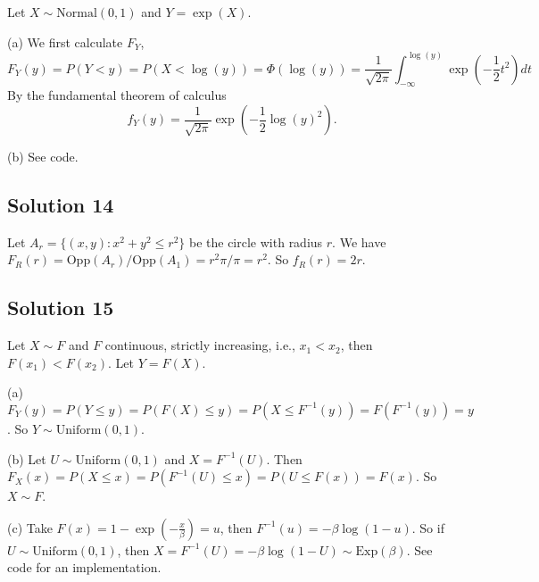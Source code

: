Let $X \sim \mathrm{Normal}(0, 1)$ and $Y = \exp(X)$.

(a) We first calculate $F_Y$,
\begin{equation*}
F_Y(y) = P(Y < y)
    = P(X < \log(y))
    = \Phi(\log(y))
    = \frac{1}{\sqrt{2\pi}} \int_{-\infty}^{\log(y)} \exp\left(-\frac{1}{2} t^2\right) dt
\end{equation*}
By the fundamental theorem of calculus
$$
f_Y(y) = \frac{1}{\sqrt{2\pi}} \exp\left(-\frac{1}{2} \log(y)^2\right).
$$

(b) See code.


\subsection*{Solution 14}

Let $A_r = \{(x, y) : x^2 + y^2 \leq r^2\}$ be the circle with radius $r$.
We have $F_R(r) = \mathrm{Opp}(A_r) / \mathrm{Opp}(A_1) = r^2 \pi / \pi = r^2$.
So $f_R(r) = 2r$.


\subsection*{Solution 15}

Let $X \sim F$ and $F$ continuous, strictly increasing, i.e., $x_1 < x_2$, then $F(x_1) < F(x_2)$.
Let $Y = F(X)$.

(a) $F_Y(y) = P(Y \leq y) = P(F(X) \leq y) = P(X \leq F^{-1}(y)) = F(F^{-1}(y)) = y$.
So $Y \sim \mathrm{Uniform}(0, 1)$.

(b) Let $U \sim \mathrm{Uniform}(0, 1)$ and $X = F^{-1}(U)$.
Then $F_X(x) = P(X \leq x) = P(F^{-1}(U) \leq x) = P(U \leq F(x)) = F(x)$.
So $X \sim F$.

(c) Take $F(x) = 1 - \exp(-\frac{x}{\beta}) = u$, then $F^{-1}(u) = -\beta \log(1 - u)$.
So if $U \sim \mathrm{Uniform}(0, 1)$, then $X = F^{-1}(U) = -\beta \log(1 - U) \sim \mathrm{Exp}(\beta)$.
See code for an implementation.
